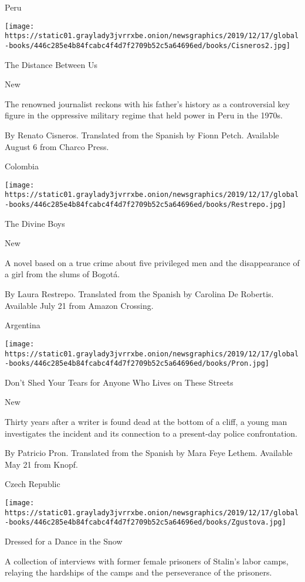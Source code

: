 Peru

\texttt{[image: https://static01.graylady3jvrrxbe.onion/newsgraphics/2019/12/17/global-books/446c285e4b84fcabc4f4d7f2709b52c5a64696ed/books/Cisneros2.jpg]}

The Distance Between Us

New

The renowned journalist reckons with his father's history as a
controversial key figure in the oppressive military regime that held
power in Peru in the 1970s.

 By Renato Cisneros. Translated from the Spanish by Fionn Petch.
Available August 6 from Charco Press.

Colombia

\texttt{[image: https://static01.graylady3jvrrxbe.onion/newsgraphics/2019/12/17/global-books/446c285e4b84fcabc4f4d7f2709b52c5a64696ed/books/Restrepo.jpg]}

The Divine Boys

New

A novel based on a true crime about five privileged men and the
disappearance of a girl from the slums of Bogotá.

 By Laura Restrepo. Translated from the Spanish by Carolina De Robertis.
Available July 21 from Amazon Crossing.

Argentina

\texttt{[image: https://static01.graylady3jvrrxbe.onion/newsgraphics/2019/12/17/global-books/446c285e4b84fcabc4f4d7f2709b52c5a64696ed/books/Pron.jpg]}

Don't Shed Your Tears for Anyone Who Lives on These Streets

New

Thirty years after a writer is found dead at the bottom of a cliff, a
young man investigates the incident and its connection to a present-day
police confrontation.

 By Patricio Pron. Translated from the Spanish by Mara Feye Lethem.
Available May 21 from Knopf.

Czech Republic

\texttt{[image: https://static01.graylady3jvrrxbe.onion/newsgraphics/2019/12/17/global-books/446c285e4b84fcabc4f4d7f2709b52c5a64696ed/books/Zgustova.jpg]}

Dressed for a Dance in the Snow

A collection of interviews with former female prisoners of Stalin's
labor camps, relaying the hardships of the camps and the perseverance of
the prisoners.

